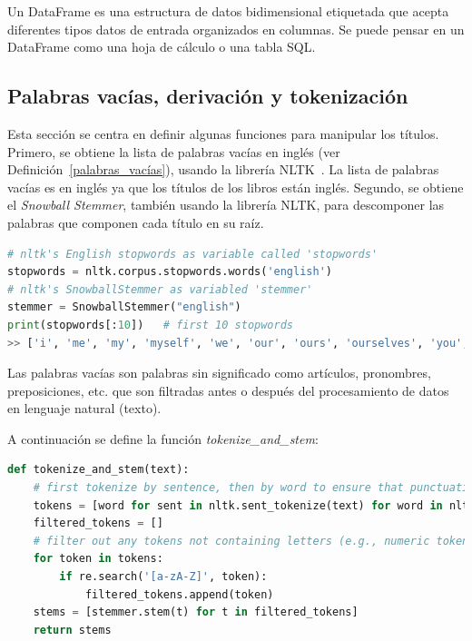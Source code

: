 \documentclass{uimppracticas}
\begin{document}
\begin{definition}\label{dataframe}
Un DataFrame es una estructura de datos bidimensional etiquetada que acepta diferentes tipos datos de entrada organizados en columnas. Se puede pensar en un DataFrame como una hoja de cálculo o una tabla SQL.
\end{definition}

\subsection{Palabras vacías, derivación y tokenización}

Esta sección se centra en definir algunas funciones para manipular los títulos. Primero, se obtiene la lista de palabras vacías en inglés (ver Definición~\ref{palabras_vacías}), usando la librería NLTK~\cite{bird2009natural}. La lista de palabras vacías es en inglés ya que los títulos de los libros están inglés. Segundo, se obtiene el \textit{Snowball Stemmer}, también usando la librería NLTK, para descomponer las palabras que componen cada título en su raíz.

\begin{lstlisting}[language=python]
# nltk's English stopwords as variable called 'stopwords'	
stopwords = nltk.corpus.stopwords.words('english')  
# nltk's SnowballStemmer as variabled 'stemmer'
stemmer = SnowballStemmer("english")
print(stopwords[:10])   # first 10 stopwords
>> ['i', 'me', 'my', 'myself', 'we', 'our', 'ours', 'ourselves', 'you', "you're"]    
\end{lstlisting}

\begin{definition}\label{palabras_vacías}
	Las palabras vacías son palabras sin significado como artículos, pronombres, preposiciones, etc. que son filtradas antes o después del procesamiento de datos en lenguaje natural (texto).
\end{definition}

A continuación se define la función \textit{tokenize\_and\_stem}: 

\begin{lstlisting}[language=python]
def tokenize_and_stem(text):
	# first tokenize by sentence, then by word to ensure that punctuation is caught as it's own token
	tokens = [word for sent in nltk.sent_tokenize(text) for word in nltk.word_tokenize(sent)]
	filtered_tokens = []
	# filter out any tokens not containing letters (e.g., numeric tokens, raw punctuation)
	for token in tokens:
		if re.search('[a-zA-Z]', token):
			filtered_tokens.append(token)
	stems = [stemmer.stem(t) for t in filtered_tokens]
	return stems  
\end{lstlisting}
\end{document}
